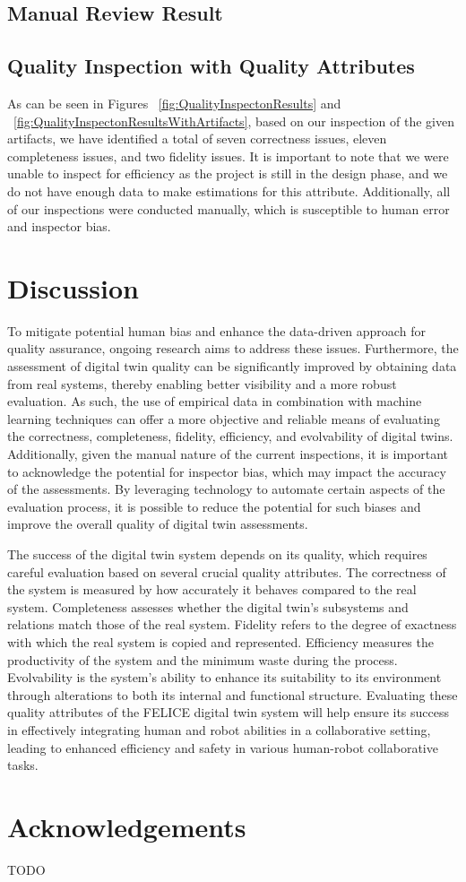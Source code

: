 \documentclass{llncs}
\begin{document}
    \subsection{Manual Review Result}
    \subsection{Quality Inspection with Quality Attributes}
    As can be seen in Figures ~\ref{fig:QualityInspectonResults} and ~\ref{fig:QualityInspectonResultsWithArtifacts}, based on our inspection of the given artifacts,
    we have identified a total of seven correctness issues, eleven completeness issues, and two fidelity issues. 
    It is important to note that we were unable to inspect for efficiency as the project is still in the design phase, 
    and we do not have enough data to make estimations for this attribute. Additionally, all of our inspections were conducted manually, 
    which is susceptible to human error and inspector bias.
    \section{Discussion}
    \label{section:framework_1}
    To mitigate potential human bias and enhance the data-driven approach for quality assurance, ongoing research aims to address these issues. 
    Furthermore, the assessment of digital twin quality can be significantly improved by obtaining data from real systems, thereby enabling better visibility and a more robust evaluation. As such, the use of empirical data in combination with machine learning techniques can offer a more objective and reliable means of evaluating the correctness, completeness, fidelity, efficiency, and evolvability of digital twins. Additionally, given the manual nature of the current inspections, it is important to acknowledge the potential for inspector bias, which may impact the accuracy of the assessments. 
    By leveraging technology to automate certain aspects of the evaluation process, it is possible to reduce the potential for such biases and improve the overall quality of digital twin assessments.
    
    The success of the digital twin system depends on its quality, which requires careful evaluation based on several crucial quality attributes. The correctness of the system is measured by how accurately it behaves compared to the real system.
    Completeness assesses whether the digital twin's subsystems and relations match those of the real system. 
    Fidelity refers to the degree of exactness with which the real system is copied and represented.
    Efficiency measures the productivity of the system and the minimum waste during the process. 
    Evolvability is the system's ability to enhance its suitability to its environment through alterations to both its internal and functional structure. 
    Evaluating these quality attributes of the FELICE digital twin system will help ensure its success in effectively integrating human and robot abilities in a collaborative setting, leading to enhanced efficiency and safety in various human-robot collaborative tasks.
    \section*{Acknowledgements}
    TODO

    
    
\end{document}
